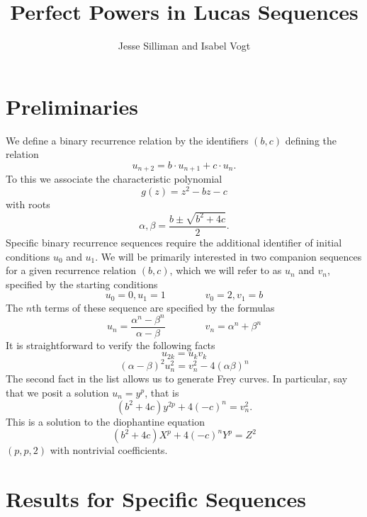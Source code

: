 \documentclass[12pt]{amsart}
\theoremstyle{definition}
\begin{document}
\title{Perfect Powers in Lucas Sequences}
\author{Jesse Silliman and Isabel Vogt}

\maketitle

\section{Preliminaries}


We define a binary recurrence relation by the identifiers $(b,c)$ defining the relation
\[ u_{n+2} = b\cdot u_{n+1}+ c\cdot u_n. \]
To this we associate the characteristic polynomial
\[ g(z) = z^2 - bz - c\]
with roots
\[ \alpha, \beta = \frac{b \pm \sqrt{b^2+4c}}{2}. \]
Specific binary recurrence sequences require the additional identifier of initial conditions $u_0$ and $u_1$.  We will be primarily interested in two companion sequences for a given recurrence relation $(b,c)$, which we will refer to as $u_n$ and $v_n$, specified by the starting conditions
\[ u_0 = 0, u_1 = 1 \qquad \qquad v_0 = 2, v_1 = b \]
The $n$th terms of these sequence are specified by the formulas
\[u_n = \frac{\alpha^n - \beta^n}{\alpha - \beta} \qquad \qquad v_n = \alpha^n +\beta^n \]
It is straightforward to verify the following facts
\begin{equation}\label{fib2} u_{2k} = u_kv_k \end{equation}
\begin{equation}\label{gen_diophan}(\alpha - \beta)^2u_n^2 = v_n^2 - 4(\alpha\beta)^n \end{equation}
The second fact in the list allows us to generate Frey curves.  In particular, say that we posit a solution $u_n = y^p$, that is
\begin{equation}\label{rel_diophan} (b^2+4c)y^{2p}+4(-c)^n = v_n^2 .\end{equation}
This is a solution to the diophantine equation
\[ (b^2+4c)X^p +4(-c)^nY^p = Z^2 \]
$(p,p,2)$ with nontrivial coefficients.

\section{Results for Specific Sequences}
\end{document}
